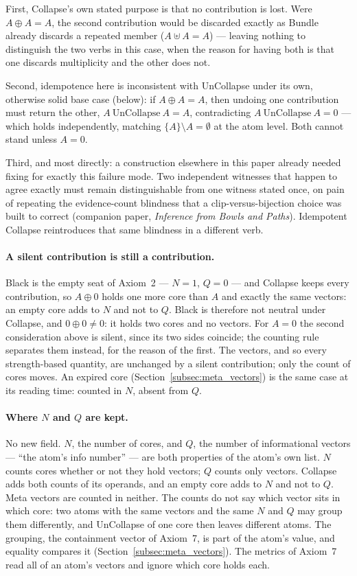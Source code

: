 \documentclass[12pt, a4paper]{article}
\begin{document}
First, Collapse's own stated purpose is that no contribution is lost.
Were $A\oplus A=A$, the second contribution would be discarded
exactly as Bundle already discards a repeated member
($A\uplus A=A$) --- leaving nothing to distinguish the two verbs in
this case, when the reason for having both is that one discards
multiplicity and the other does not.

Second, idempotence here is inconsistent with UnCollapse under its
own, otherwise solid base case (below): if $A\oplus A=A$, then
undoing one contribution must return the other, $A\ \text{UnCollapse}\ A=A$,
contradicting $A\ \text{UnCollapse}\ A=0$ --- which holds independently, matching
$\{A\}\setminus A=\emptyset$ at the atom level. Both cannot stand
unless $A=0$.

Third, and most directly: a construction elsewhere in this paper
already needed fixing for exactly this failure mode. Two independent
witnesses that happen to agree exactly must remain distinguishable
from one witness stated once, on pain of repeating the
evidence-count blindness that a clip-versus-bijection choice was
built to correct (companion paper, \emph{Inference from Bowls and
Paths}). Idempotent Collapse reintroduces that same blindness in a
different verb.

\paragraph{A silent contribution is still a contribution.} Black is
the empty seat of Axiom~2 --- $N=1$, $Q=0$ --- and Collapse keeps every
contribution, so $A\oplus 0$ holds one more core than $A$ and exactly
the same vectors: an empty core adds to $N$ and not to $Q$. Black is
therefore not neutral under Collapse, and $0\oplus 0\ne 0$: it holds
two cores and no vectors. For $A=0$ the second consideration above is
silent, since its two sides coincide; the counting rule separates them
instead, for the reason of the first. The vectors, and so every
strength-based quantity, are unchanged by a silent contribution; only
the count of cores moves. An expired core
(Section~\ref{subsec:meta_vectors}) is the same case at its reading
time: counted in $N$, absent from $Q$.

\paragraph{Where $N$ and $Q$ are kept.} No new field. $N$, the number
of cores, and $Q$, the number of informational vectors --- ``the atom's
info number'' --- are both properties of the atom's own list. $N$ counts cores whether or not they hold vectors; $Q$ counts only vectors. Collapse adds both counts of its operands, and an empty core adds to $N$ and not to $Q$. Meta vectors are counted in neither. The counts do not say which vector sits in which core: two atoms with the same vectors and the same $N$ and $Q$ may group them differently, and UnCollapse of one core then leaves different atoms. The grouping, the containment vector of Axiom~7, is part of the atom's value, and equality compares it (Section~\ref{subsec:meta_vectors}). The metrics of Axiom~7 read all of an atom's vectors and ignore which core holds each.
\end{document}
